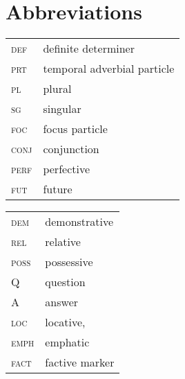 \documentclass[output=paper,modfonts,nonflat,
\ChapterDOI{10.5281/zenodo.3367154}
 hidelinks
]{langsci/langscibook}
\begin{document}
\section*{Abbreviations}
\begin{tabularx}{.55\textwidth}{ll}
\textsc{def} & {definite determiner}        \\
\textsc{prt} & {temporal adverbial particle}\\
\textsc{pl} & {plural}                      \\
\textsc{sg}& {singular}                      \\
\textsc{foc} & {focus particle}             \\
\textsc{conj} & {conjunction}               \\
\textsc{perf} & {perfective}                \\
\textsc{fut} & {future}                     \\
\end{tabularx}
\begin{tabularx}{.45\textwidth}{ll}
\textsc{dem} & {demonstrative}              \\
\textsc{rel} & {relative}                   \\
\textsc{poss} & {possessive}                \\
Q & {question}                              \\
A & {answer}                                \\
\textsc{loc} & {locative},                  \\
\textsc{emph} & {emphatic}                  \\
\textsc{fact} & {factive marker}            \\
\end{tabularx}


\end{document}
